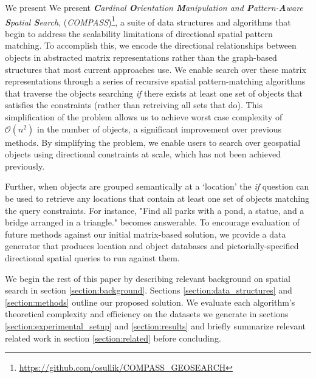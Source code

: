 We present We present \textit{\textbf{C}ardinal \textbf{O}rientation \textbf{M}anipulation and \textbf{P}attern-\textbf{A}ware \textbf{S}patial \textbf{S}earch}, (\emph{COMPASS})\footnote{\url{https://github.com/osullik/COMPASS_GEOSEARCH}}, a suite of data structures and algorithms that begin to address the scalability limitations of directional spatial pattern matching.
To accomplish this, we encode the directional relationships between objects in abstracted matrix representations rather than the graph-based structures that most current approaches use.
We enable search over these matrix representations through a series of recursive spatial pattern-matching algorithms that traverse the objects searching \emph{if} there exists at least one set of objects that satisfies the constraints (rather than retreiving all sets that do).
This simplification of the problem allows us to achieve worst case complexity of $\mathcal{O}(n^2)$ in the number of objects, a significant improvement over previous methods.
By simplifying the problem, we enable users to search over geospatial objects using directional constraints at scale, which has not been achieved previously.

Further, when objects are grouped semantically at a `location' the \emph{if} question can be used to retrieve any locations that contain at least one set of objects matching the query constraints.
For instance, "Find all parks with a pond, a statue, and a bridge arranged in a triangle." becomes answerable.
To encourage evaluation of future methods against our initial matrix-based solution, we provide a data generator that produces location and object databases and pictorially-specified directional spatial queries to run against them.

We begin the rest of this paper by describing relevant background on spatial search in section \ref{section:background}. Sections \ref{section:data_structures} and \ref{section:methods} outline our proposed solution. We evaluate each algorithm's theoretical complexity and efficiency on the datasets we generate in sections \ref{section:experimental_setup} and \ref{section:results} and briefly summarize relevant related work in section \ref{section:related} before concluding.